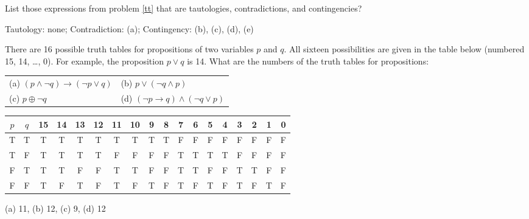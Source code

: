 \documentclass[12pt,addpoints]{exam}
\newcommand{\ra}{\rightarrow}
\begin{document}
\begin{questions}
\question[3] List those expressions from problem \ref{tt} that are tautologies, contradictions, and contingencies?
    \ifprintanswers
        \vspace{-15pt}
    \fi
    \begin{solution}
       Tautology: none;
       Contradiction: (a);
       Contingency: (b), (c), (d), (e)
    \end{solution}


\question[8] There are 16 possible truth tables for propositions of two variables $p$ and $q$.
 All sixteen possibilities are given in the table below (numbered 15, 14, \ldots, 0).
 For example, the proposition $p \vee q$ is 14. What are the numbers of the truth
 tables for propositions:
     \ifprintanswers
        \vspace{-10pt}
    \fi
\begin{center}
 \begin{tabular}{ll}
    (a) $(p \wedge \neg q) \ra (\neg p \vee q)$ \quad &  (b) $p \vee (\neg q \wedge p)$ \\
    (c) $p \oplus \neg q $ \quad \quad& (d) $(\neg p \ra q) \wedge (\neg q \vee p)$ \\
 \end{tabular}

 \footnotesize
 \begin{tabular}{cc|cccc|cccc|cccc|cccc}
    $p$ & $q$ & 15 & 14 & 13 & 12 & 11 & 10 & 9 & 8 & 7 & 6 & 5 & 4 & 3 & 2 & 1 & 0 \\
    \hline
    T & T & T & T & T & T & T & T & T & T & F & F & F & F & F & F & F & F \\
    T & F & T & T & T & T & F & F & F & F & T & T & T & T & F & F & F & F \\
    F & T & T & T & F & F & T & T & F & F & T & T & F & F & T & T & F & F \\
    F & F & T & F & T & F & T & F & T & F & T & F & T & F & T & F & T & F \\
 \end{tabular}
 \end{center}
 \normalsize
     \ifprintanswers
        \vspace{-15pt}
    \fi
    \begin{solution} (a) 11, (b) 12, (c) 9, (d) 12
    \end{solution}




\end{questions}
\end{document}
